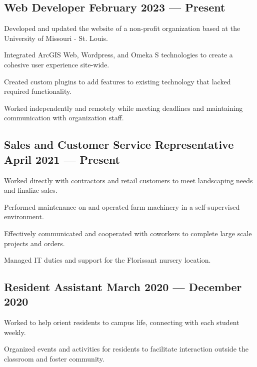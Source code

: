 
\subsection{{Web Developer \hfill February 2023 --- Present}}
\begin{zitemize}
\item Developed and updated the website of a non-profit organization based at the University of Missouri - St. Louis.
\item Integrated ArcGIS Web, Wordpress, and Omeka S technologies to create a cohesive user experience site-wide.
\item Created custom plugins to add features to existing technology that lacked required functionality.
\item Worked independently and remotely while meeting deadlines and maintaining communication with organization staff.
\end{zitemize}

\subsection{{Sales and Customer Service Representative  \hfill April 2021 --- Present}}
\begin{zitemize}  
\item Worked directly with contractors and retail customers to meet landscaping needs and finalize sales.
\item Performed maintenance on and operated farm machinery in a self-supervised environment.
\item Effectively communicated and cooperated with coworkers to complete large scale projects and orders.
\item Managed IT duties and support for the Florissant nursery location.
\end{zitemize}


\subsection{{Resident Assistant \hfill March 2020 --- December 2020}}
\begin{zitemize}
\item Worked to help orient residents to campus life, connecting with each student weekly.
\item Organized events and activities for residents to facilitate interaction outside the classroom and foster community.
\end{zitemize}

